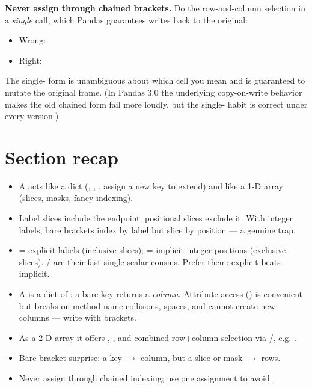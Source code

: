 \documentclass[11pt]{article}
\begin{document}
\begin{pitfall}
\textbf{Never assign through chained brackets.} Do the row-and-column selection in a \emph{single}  call, which Pandas guarantees writes back to the original:
\begin{itemize}
  \item Wrong: 
  \item Right: 
\end{itemize}
The single- form is unambiguous about which cell you mean and is guaranteed to mutate the original frame. (In Pandas 3.0 the underlying copy-on-write behavior makes the old chained form fail more loudly, but the single- habit is correct under every version.)
\end{pitfall}

\section*{Section recap}
\begin{itemize}
  \item A  acts like a dict (, , , assign a new key to extend) and like a 1-D array (slices, masks, fancy indexing).
  \item Label slices include the endpoint; positional slices exclude it. With integer labels, bare brackets index by label but slice by position --- a genuine trap.
  \item {} = explicit labels (inclusive slices);  = implicit integer positions (exclusive slices). / are their fast single-scalar cousins. Prefer them: explicit beats implicit.
  \item A  is a dict of : a bare key returns a \emph{column}. Attribute access () is convenient but breaks on method-name collisions, spaces, and cannot create new columns --- write with brackets.
  \item As a 2-D array it offers , , and combined row+column selection via /, e.g. .
  \item Bare-bracket surprise: a key $\to$ column, but a slice or mask $\to$ rows.
  \item Never assign through chained indexing; use one  assignment to avoid .
\end{itemize}
\end{document}
